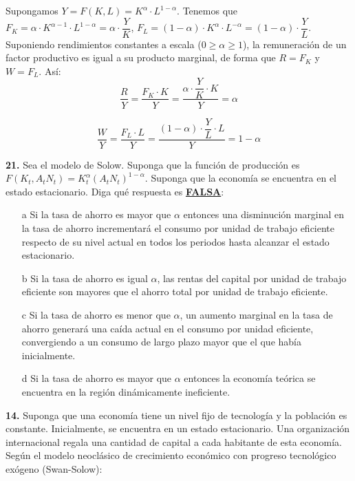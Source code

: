 \documentclass{nuevotema}
\begin{document}
Supongamos $Y=F(K,L) = K^\alpha \cdot L^{1-\alpha}$. Tenemos que $F_K=\alpha \cdot K^{\alpha-1} \cdot L^{1-\alpha} = \alpha \cdot \dfrac{Y}{K}$, $F_L=(1-\alpha) \cdot K^\alpha \cdot L^{-\alpha} = (1-\alpha) \cdot \dfrac{Y}{L}$. Suponiendo rendimientos constantes a escala ($0 \geq \alpha \geq 1$), la remuneración de un factor productivo es igual a su producto marginal, de forma que $R = F_K$ y $W = F_L$. Así:
\begin{equation}
\dfrac{R}{Y} = \dfrac{F_K\cdot K}{Y} = \dfrac{\alpha \cdot \dfrac{Y}{K}\cdot K}{Y} = \alpha
\end{equation}

\begin{equation}
	\dfrac{W}{Y} = \dfrac{F_L\cdot L}{Y} = \dfrac{(1-\alpha) \cdot \dfrac{Y}{L}\cdot L}{Y} = 1-\alpha
\end{equation}


\preguntas

\textbf{21.} Sea el modelo de Solow. Suponga que la función de producción es $F(K_t, A_t N_t) = K_t^\alpha (A_t N_t)^{1-\alpha}$. Suponga que la economía se encuentra en el estado estacionario. Diga qué respuesta es \textbf{\underline{FALSA}}:

\begin{itemize}
	\item[a] Si la tasa de ahorro es mayor que $\alpha$ entonces una disminución marginal en la tasa de ahorro incrementará el consumo por unidad de trabajo eficiente respecto de su nivel actual en todos los periodos hasta alcanzar el estado estacionario.
	\item[b] Si la tasa de ahorro es igual $\alpha$, las rentas del capital por unidad de trabajo eficiente son mayores que el ahorro total por unidad de trabajo eficiente.
	\item[c] Si la tasa de ahorro es menor que $\alpha$, un aumento marginal en la tasa de ahorro generará una caída actual en el consumo por unidad eficiente, convergiendo a un consumo de largo plazo mayor que el que había inicialmente.
	\item[d] Si la tasa de ahorro es mayor que $\alpha$ entonces la economía teórica se encuentra en la región dinámicamente ineficiente. 
\end{itemize}

\textbf{14.} Suponga que una economía tiene un nivel fijo de tecnología y la población es constante. Inicialmente, se encuentra en un estado estacionario. Una organización internacional regala una cantidad de capital a cada habitante de esta economía. Según el modelo neoclásico de crecimiento económico con progreso tecnológico exógeno (Swan-Solow):
\end{document}
